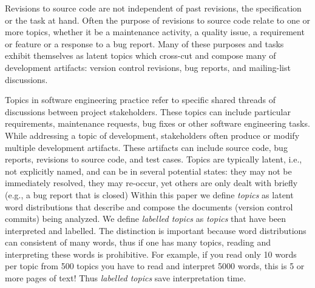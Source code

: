 \documentclass[]{sig-alternate}
\begin{document}
Revisions to
source code are not independent of past revisions, the specification or
the task at hand.
Often the purpose of revisions to source code relate to one or more topics, whether it be a maintenance activity, a quality issue, a requirement or feature or a response to a bug report.
Many of these purposes and tasks exhibit themselves as latent topics which cross-cut and compose many of development artifacts: version control revisions, bug reports, and mailing-list discussions.

Topics in software engineering practice refer to specific shared threads of discussions between project stakeholders. 
These topics can include particular requirements, maintenance requests, bug fixes or other software engineering tasks. %
While addressing a topic of development, stakeholders often produce or modify multiple development artifacts.
%
These artifacts can include source code, bug reports, revisions to source code, and test cases. 
%
Topics are typically latent, i.e., not explicitly named, and can be in several potential states: they may not be immediately resolved, they may re-occur, yet others are only dealt with briefly  (e.g., a bug report that is closed)
Within this paper we define \emph{topics} as latent word distributions that describe and compose the documents (version control commits) being analyzed. 
We define \emph{labelled topics} as \emph{topics} that have been interpreted and labelled. 
The distinction is important because word distributions can consistent of many words, thus if one has many topics, reading and interpreting these words is prohibitive.
For example, if you read only 10 words per topic from 500 topics you have to read and interpret 5000 words, this is 5 or more pages of text!
Thus \emph{labelled topics} save interpretation time.
\end{document}
